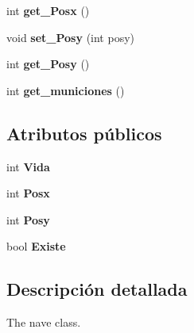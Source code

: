 \begin{DoxyCompactItemize}
\item 
\hypertarget{classnave_a2ee2f19620899f3a104c5e5fd53f11b8}{int {\bfseries get\+\_\+\+Posx} ()}\label{classnave_a2ee2f19620899f3a104c5e5fd53f11b8}

\item 
\hypertarget{classnave_a4a93e87a592eefa3cac14155a61f9829}{void {\bfseries set\+\_\+\+Posy} (int posy)}\label{classnave_a4a93e87a592eefa3cac14155a61f9829}

\item 
\hypertarget{classnave_ae97a448e15092f85e1f83d36c9078809}{int {\bfseries get\+\_\+\+Posy} ()}\label{classnave_ae97a448e15092f85e1f83d36c9078809}

\item 
\hypertarget{classnave_a109542f61e18bf2633b519e3da267c83}{int {\bfseries get\+\_\+municiones} ()}\label{classnave_a109542f61e18bf2633b519e3da267c83}

\end{DoxyCompactItemize}
\subsection*{Atributos públicos}
\begin{DoxyCompactItemize}
\item 
\hypertarget{classnave_a216fab5dcc693394b3252add08629039}{int {\bfseries Vida}}\label{classnave_a216fab5dcc693394b3252add08629039}

\item 
\hypertarget{classnave_ac9ba49b3d59e902240698405a8529566}{int {\bfseries Posx}}\label{classnave_ac9ba49b3d59e902240698405a8529566}

\item 
\hypertarget{classnave_a39a3d2114d0de42b8c88690a35c58cb5}{int {\bfseries Posy}}\label{classnave_a39a3d2114d0de42b8c88690a35c58cb5}

\item 
\hypertarget{classnave_a5c214e33590287d4449109c817310647}{bool {\bfseries Existe}}\label{classnave_a5c214e33590287d4449109c817310647}

\end{DoxyCompactItemize}


\subsection{Descripción detallada}
The nave class. 


